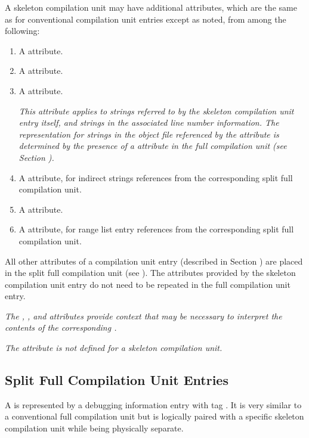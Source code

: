 A skeleton compilation unit may have additional attributes,
which are the same as for conventional compilation unit entries
except as noted, from among the following:
\db
\begin{enumerate}[1. ]
\addtocounter{enumi}{2}
\item A \DWATstmtlist{} attribute.
\item A \DWATcompdir{} attribute.

\item A \DWATuseUTFeight{} attribute.

\textit{This attribute applies to strings referred to by the skeleton
compilation unit entry itself, and strings in the associated line
number information.
The representation for strings in the object file referenced
by the \DWATdwoname{} attribute is determined by the presence
of a \DWATuseUTFeight{} attribute in the full compilation unit
(see Section ).}

\item A
\bb
\DWATstroffsets{}
\eb
attribute, for indirect strings references from the
\bb
corresponding split full
\eb
compilation unit.

\item A \DWATaddrbase{} attribute.

\bb
\item A \DWATrnglistsbase{} attribute, for range list entry references
from the corresponding split full compilation unit.
\eb

\end{enumerate}

All other attributes of a compilation unit entry (described
in Section )
are placed in the split full compilation unit
(see ).
The attributes provided by the skeleton compilation
unit entry do not need to be repeated in the full compilation
unit entry.

\textit{The \DWATaddrbase{},
\bb
\DWATstroffsets{}, and \DWATrnglistsbase{}
\eb
attributes provide context that may be
necessary to interpret the contents
of the corresponding \splitDWARFobjectfile.}

\textit{The \DWATbasetypes{} attribute is not defined for a
skeleton compilation unit.}


\subsection{Split Full Compilation Unit Entries}
\label{chap:splitfullcompilationunitentries}
A  is represented by a
debugging information entry with tag \DWTAGcompileunit.
It is very similar to a conventional full compilation unit but
is logically paired with a specific skeleton compilation unit while
being physically separate.

